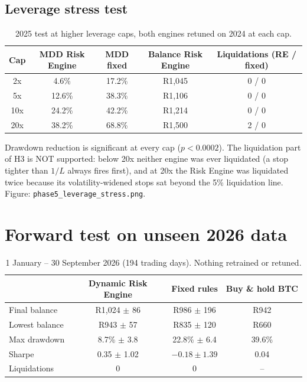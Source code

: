 \subsection{Leverage stress test}
\begin{table}[ht]
  \centering
  \caption{2025 test at higher leverage caps, both engines retuned on 2024 at each cap.}
  \label{tab:stress}
  \small
  \begin{tabular}{ccccc}
    \toprule
    Cap & MDD Risk Engine & MDD fixed & Balance Risk Engine & Liquidations (RE / fixed) \\
    \midrule
    2x  & 4.6\%  & 17.2\% & R1{,}045 & 0 / 0 \\
    5x  & 12.6\% & 38.3\% & R1{,}106 & 0 / 0 \\
    10x & 24.2\% & 42.2\% & R1{,}214 & 0 / 0 \\
    20x & 38.2\% & 68.8\% & R1{,}500 & 2 / 0 \\
    \bottomrule
  \end{tabular}
\end{table}

\begin{guide}
Drawdown reduction is significant at every cap ($p<0.0002$). The liquidation part of H3 is NOT supported: below 20x neither engine was ever liquidated (a stop tighter than $1/L$ always fires first), and at 20x the Risk Engine was liquidated twice because its volatility-widened stops sat beyond the 5\% liquidation line. Figure: \texttt{phase5\_leverage\_stress.png}.
\end{guide}
\tbc{}

\section{Forward test on unseen 2026 data}\label{sec:res-forward}

\begin{table}[ht]
  \centering
  \caption{1 January -- 30 September 2026 (194 trading days). Nothing retrained or retuned.}
  \label{tab:forward}
  \begin{tabular}{lccc}
    \toprule
    & Dynamic Risk Engine & Fixed rules & Buy \& hold BTC \\
    \midrule
    Final balance  & R1{,}024 $\pm$ 86 & R986 $\pm$ 196 & R942 \\
    Lowest balance & R943 $\pm$ 57 & R835 $\pm$ 120 & R660 \\
    Max drawdown   & 8.7\% $\pm$ 3.8 & 22.8\% $\pm$ 6.4 & 39.6\% \\
    Sharpe         & 0.35 $\pm$ 1.02 & $-0.18 \pm 1.39$ & 0.04 \\
    Liquidations   & 0 & 0 & -- \\
    \bottomrule
  \end{tabular}
\end{table}


